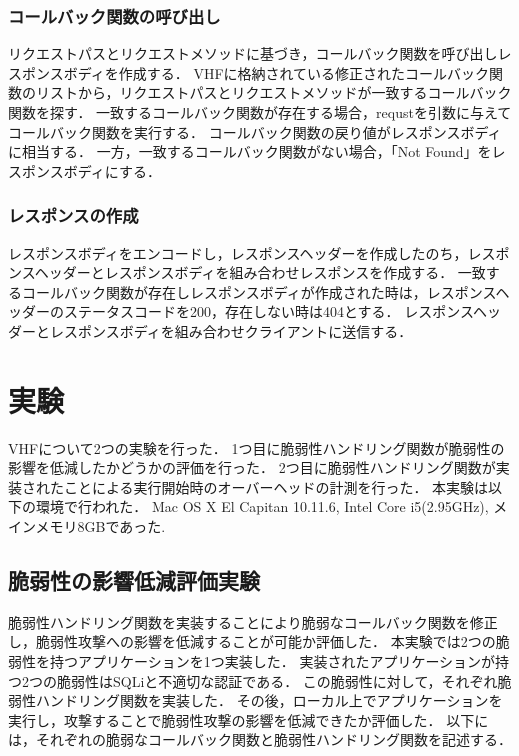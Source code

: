 \documentclass[a4paper,12pt]{jreport}
\begin{document}
\subsection{コールバック関数の呼び出し}
リクエストパスとリクエストメソッドに基づき，コールバック関数を呼び出しレスポンスボディを作成する．
VHFに格納されている修正されたコールバック関数のリストから，リクエストパスとリクエストメソッドが一致するコールバック関数を探す．
一致するコールバック関数が存在する場合，requstを引数に与えてコールバック関数を実行する．
コールバック関数の戻り値がレスポンスボディに相当する．
一方，一致するコールバック関数がない場合，「Not Found」をレスポンスボディにする．

\subsection{レスポンスの作成}
レスポンスボディをエンコードし，レスポンスヘッダーを作成したのち，レスポンスヘッダーとレスポンスボディを組み合わせレスポンスを作成する．
一致するコールバック関数が存在しレスポンスボディが作成された時は，レスポンスヘッダーのステータスコードを200，存在しない時は404とする．
レスポンスヘッダーとレスポンスボディを組み合わせクライアントに送信する．

\chapter{実験}
VHFについて2つの実験を行った．
1つ目に脆弱性ハンドリング関数が脆弱性の影響を低減したかどうかの評価を行った．
2つ目に脆弱性ハンドリング関数が実装されたことによる実行開始時のオーバーヘッドの計測を行った．
本実験は以下の環境で行われた．
Mac OS X El Capitan 10.11.6, Intel Core i5(2.95GHz), メインメモリ8GBであった.

\section{脆弱性の影響低減評価実験}
脆弱性ハンドリング関数を実装することにより脆弱なコールバック関数を修正し，脆弱性攻撃への影響を低減することが可能か評価した．
本実験では2つの脆弱性を持つアプリケーションを1つ実装した．
実装されたアプリケーションが持つ2つの脆弱性はSQLiと不適切な認証である．
この脆弱性に対して，それぞれ脆弱性ハンドリング関数を実装した．
その後，ローカル上でアプリケーションを実行し，攻撃することで脆弱性攻撃の影響を低減できたか評価した．
以下には，それぞれの脆弱なコールバック関数と脆弱性ハンドリング関数を記述する．
\end{document}
